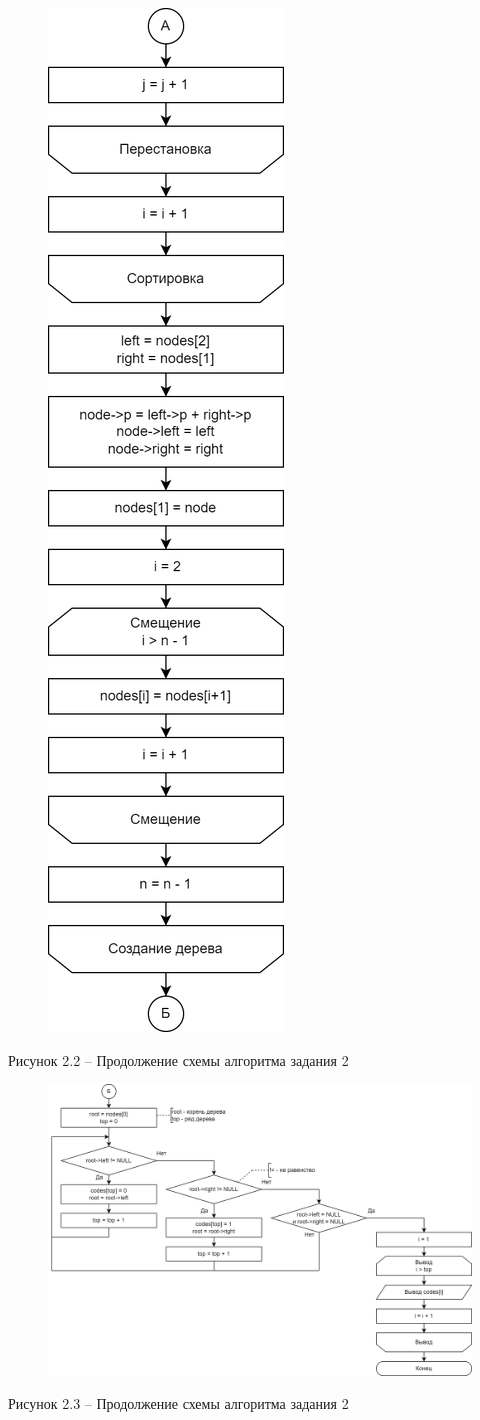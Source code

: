\documentclass[a4paper,14pt]{extarticle}
\begin{document}
	\begin{figure}[h]
		\centering
		\includegraphics[width=0.27\linewidth]{schemes/s-2-2}
	\end{figure}
	\begin{center}
		Рисунок 2.2 – Продолжение схемы алгоритма задания 2
	\end{center}
	\pagebreak
	
	\begin{figure}[h]
		\centering
		\includegraphics[width=1\linewidth]{schemes/s-2-3}
	\end{figure}
	\begin{center}
		Рисунок 2.3 – Продолжение схемы алгоритма задания 2
	\end{center}
	
\end{document}
